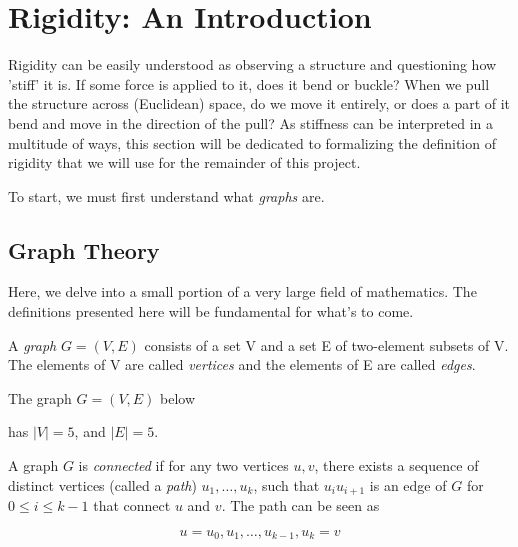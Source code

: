 \chapter{Rigidity: An Introduction} %

\begin{flushleft}
Rigidity can be easily understood as observing a structure and questioning how 'stiff' it is. If some force is applied to it, does it bend or buckle? When we pull the structure across (Euclidean) space, do we move it entirely, or does a part of it bend and move in the direction of the pull? As stiffness can be interpreted in a multitude of ways, this section will be dedicated to formalizing the definition of rigidity that we will use for the remainder of this project. 
\end{flushleft}

\begin{flushleft}
To start, we must first understand what \textit{graphs} are.
\end{flushleft}

\section{Graph Theory}

\begin{flushleft}
Here, we delve into a small portion of a very large field of mathematics. The definitions presented here will be fundamental for what's to come.
\end{flushleft}

\begin{definition}
    A \textit{graph} $G = (V,E)$ consists of a set V and a set E of two-element subsets of V. The elements of V are called \textit{vertices} and the elements of E are called \textit{edges}.
\end{definition}

\begin{example}
The graph $G = (V,E)$ below
\label{eg: cycle}
\begin{figure}[ht]
    \centering
    
    \label{simple graph}
\end{figure}
\noindent
has $|V| = 5$, and $|E| = 5$.
\end{example}

\begin{definition}
A graph $G$ is \textit{connected} if for any two vertices $u,v$, there exists a sequence of distinct vertices (called a \textit{path}) $u_1, \hdots, u_k$, such that $u_iu_{i+1}$ is an edge of $G$ for $0 \leq i \leq k-1$ that connect $u$ and $v$. The path can be seen as 

\[
u = u_0, u_1, \hdots, u_{k-1}, u_k = v
\]
\end{definition}

